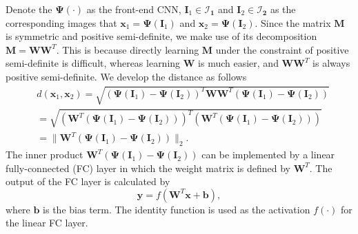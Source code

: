 \documentclass[10pt,twocolumn,letterpaper]{article}
\begin{document}
Denote the $\mathbf{\Psi} (\cdot)$ as the front-end CNN, $\mathbf{I}_1 \in \mathcal{I}_\mathbf{1}$ and $\mathbf{I}_2 \in \mathcal{I}_\mathbf{2}$ as the corresponding images that $\mathbf{x}_1 = \mathbf{\Psi}(\mathbf{I}_1)$ and $\mathbf{x}_2 = \mathbf{\Psi}(\mathbf{I}_2)$.
Since the matrix $\textbf{M}$ is symmetric and positive semi-definite, we make use of its decomposition $\textbf{M} = \textbf{W}\textbf{W}^T$.
This is because directly learning $\textbf{M}$ under the constraint of positive semi-definite is difficult,
whereas learning $\textbf{W}$ is much easier, and $\textbf{W}\textbf{W}^T$ is always positive semi-definite.
We develop the distance as follows
\begin{align}\label{M-dist-dev-2}
    & d(\mathbf{x}_1, \mathbf{x}_2)  = \sqrt{ (\mathbf{\Psi}(\mathbf{I}_1) - \mathbf{\Psi}(\mathbf{I}_2))^T \textbf{W}\textbf{W}^T (\mathbf{\Psi}(\mathbf{I}_1) - \mathbf{\Psi}(\mathbf{I}_2)) }    \nonumber   \\
    & = \sqrt{ (\textbf{W}^T(\mathbf{\Psi}(\mathbf{I}_1) - \mathbf{\Psi}(\mathbf{I}_2)))^T(\textbf{W}^T(\mathbf{\Psi}(\mathbf{I}_1) - \mathbf{\Psi}(\mathbf{I}_2))) }            \nonumber   \\
    & = \|\textbf{W}^T(\mathbf{\Psi}(\mathbf{I}_1) - \mathbf{\Psi}(\mathbf{I}_2))\|_2.
\end{align}
The inner product $\textbf{W}^T(\mathbf{\Psi}(\mathbf{I}_1) - \mathbf{\Psi}(\mathbf{I}_2))$ can be implemented by a linear fully-connected (FC) layer in which the weight matrix is defined by $\textbf{W}^T$.
The output of the FC layer is calculated by
\begin{equation}\label{FC_compute}
    \mathbf{y} = f(\textbf{W}^T\mathbf{x} + \mathbf{b}),
\end{equation}
where $\mathbf{b}$ is the bias term.
The identity function is used as the activation $f(\cdot)$ for the linear FC layer.
\end{document}
